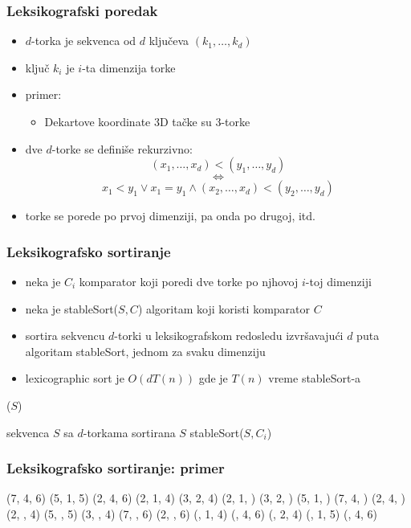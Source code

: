 \documentclass[compress]{beamer}
\begin{document}
\begin{frame}
  \frametitle{Leksikografski poredak}
  \begin{itemize}
    \item $d$-torka je sekvenca od $d$ ključeva $(k_1,\ldots,k_d)$
    \item ključ $k_i$ je $i$-ta dimenzija torke
    \item primer:
    \begin{itemize}
      \item Dekartove koordinate 3D tačke su 3-torke
    \end{itemize}
    \item {} dve $d$-torke se definiše rekurzivno:
    $$(x_1,\ldots,x_d) < (y_1,\ldots,y_d) $$
    $$\Leftrightarrow$$ 
    $$x_1 < y_1 \lor x_1 = y_1 \land (x_2,\ldots,x_d)<(y_2,\ldots,y_d)$$
    \item torke se porede po prvoj dimenziji, pa onda po drugoj, itd.
  \end{itemize}
\end{frame}

\begin{frame}
  \frametitle{Leksikografsko sortiranje}
  \begin{itemize}
    \item neka je $C_i$ komparator koji poredi dve torke po njhovoj $i$-toj dimenziji
    \item neka je stableSort($S, C$) algoritam koji koristi komparator $C$
    \item {} sortira sekvencu $d$-torki u leksikografskom redosledu izvršavajući $d$ puta algoritam stableSort, jednom za svaku dimenziju
    \item lexicographic sort je $O(dT(n))$ gde je $T(n)$ vreme stableSort-a
  \end{itemize}
($S$)
\begin{algorithmic}
\REQUIRE sekvenca $S$ sa $d$-torkama
\ENSURE sortirana $S$
  \STATE stableSort($S, C_i$)
\ENDFOR
\end{algorithmic}
\end{frame}

\begin{frame}
  \frametitle{Leksikografsko sortiranje: primer}
(7, 4, 6) (5, 1, 5) (2, 4, 6) (2, 1, 4) (3, 2, 4)
(2, 1, ) (3, 2, ) (5, 1, ) (7, 4, ) (2, 4, )
(2, , 4) (5, , 5) (3, , 4) (7, , 6) (2, , 6)
(, 1, 4) (, 4, 6) (, 2, 4) (, 1, 5) (, 4, 6)
\end{frame}
\end{document}
